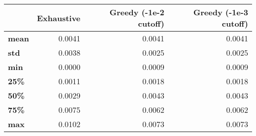 \begin{tabular}{lrrr}
\toprule
{} &  Exhaustive &  Greedy (-1e-2 cutoff) &  Greedy (-1e-3 cutoff) \\
\midrule
\textbf{mean} &      0.0041 &                 0.0041 &                 0.0041 \\
\textbf{std } &      0.0038 &                 0.0025 &                 0.0025 \\
\textbf{min } &      0.0000 &                 0.0009 &                 0.0009 \\
\textbf{25\% } &      0.0011 &                 0.0018 &                 0.0018 \\
\textbf{50\% } &      0.0029 &                 0.0043 &                 0.0043 \\
\textbf{75\% } &      0.0075 &                 0.0062 &                 0.0062 \\
\textbf{max } &      0.0102 &                 0.0073 &                 0.0073 \\
\bottomrule
\end{tabular}
